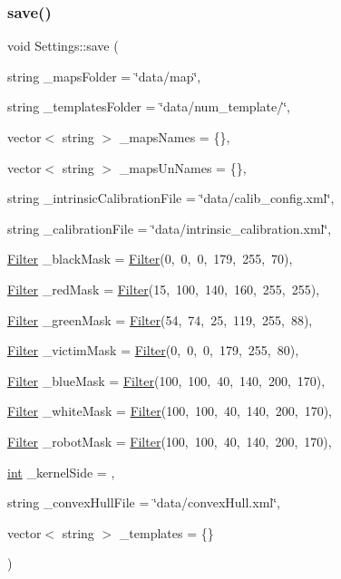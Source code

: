 \subsubsection{\texorpdfstring{save()}{save()}}
{\footnotesize\ttfamily void Settings\+::save (\begin{DoxyParamCaption}\item[{string}]{\+\_\+maps\+Folder = {\ttfamily \char`\"{}data/map\char`\"{}},  }\item[{string}]{\+\_\+templates\+Folder = {\ttfamily \char`\"{}data/num\+\_\+template/\char`\"{}},  }\item[{vector$<$ string $>$}]{\+\_\+maps\+Names = {\ttfamily \{\}},  }\item[{vector$<$ string $>$}]{\+\_\+maps\+Un\+Names = {\ttfamily \{\}},  }\item[{string}]{\+\_\+intrinsic\+Calibration\+File = {\ttfamily \char`\"{}data/calib\+\_\+config.xml\char`\"{}},  }\item[{string}]{\+\_\+calibration\+File = {\ttfamily \char`\"{}data/intrinsic\+\_\+calibration.xml\char`\"{}},  }\item[{\mbox{\hyperlink{class_filter}{Filter}}}]{\+\_\+black\+Mask = {\ttfamily \mbox{\hyperlink{class_filter}{Filter}}(0,~0,~0,~179,~255,~70)},  }\item[{\mbox{\hyperlink{class_filter}{Filter}}}]{\+\_\+red\+Mask = {\ttfamily \mbox{\hyperlink{class_filter}{Filter}}(15,~100,~140,~160,~255,~255)},  }\item[{\mbox{\hyperlink{class_filter}{Filter}}}]{\+\_\+green\+Mask = {\ttfamily \mbox{\hyperlink{class_filter}{Filter}}(54,~74,~25,~119,~255,~88)},  }\item[{\mbox{\hyperlink{class_filter}{Filter}}}]{\+\_\+victim\+Mask = {\ttfamily \mbox{\hyperlink{class_filter}{Filter}}(0,~0,~0,~179,~255,~80)},  }\item[{\mbox{\hyperlink{class_filter}{Filter}}}]{\+\_\+blue\+Mask = {\ttfamily \mbox{\hyperlink{class_filter}{Filter}}(100,~100,~40,~140,~200,~170)},  }\item[{\mbox{\hyperlink{class_filter}{Filter}}}]{\+\_\+white\+Mask = {\ttfamily \mbox{\hyperlink{class_filter}{Filter}}(100,~100,~40,~140,~200,~170)},  }\item[{\mbox{\hyperlink{class_filter}{Filter}}}]{\+\_\+robot\+Mask = {\ttfamily \mbox{\hyperlink{class_filter}{Filter}}(100,~100,~40,~140,~200,~170)},  }\item[{\mbox{\hyperlink{draw_8hh_aa620a13339ac3a1177c86edc549fda9b}{int}}}]{\+\_\+kernel\+Side = {},  }\item[{string}]{\+\_\+convex\+Hull\+File = {\ttfamily \char`\"{}data/convexHull.xml\char`\"{}},  }\item[{vector$<$ string $>$}]{\+\_\+templates = {\ttfamily \{\}} }\end{DoxyParamCaption})}



